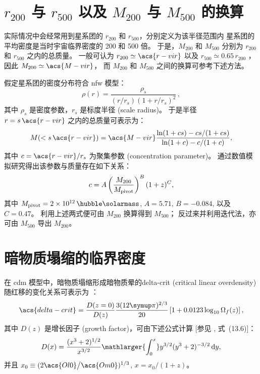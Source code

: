 \section{%
  \texorpdfstring{$r_{200}$}{r200} 与 \texorpdfstring{$r_{500}$}{r500} 以及
  \texorpdfstring{$M_{200}$}{M200} 与 \texorpdfstring{$M_{500}$}{M500} 的换算}
\label{sec:r-m-conv}

实际情况中会经常用到星系团的 $r_{200}$ 和 $r_{500}$，分别定义为该半径范围内
星系团的平均密度是当时宇宙临界密度的 200 和 500 倍。
于是，$M_{200}$ 和 $M_{500}$ 分别为 $r_{200}$ 和 $r_{500}$ 之内的总质量。
一般可认为 $r_{200} \simeq \acs{r-vir}$
以及 $r_{500} \simeq 0.65 \, r_{200}$ \cite{ettori2009}，
因此 $M_{200} \simeq \acs{M-vir}$，
而 $M_{200}$ 和 $M_{500}$ 之间的换算可参考下述方法。

假定星系团的密度分布符合 \ac{nfw} 模型\cite{navarro1997}：
\begin{equation}
  \label{eq:nfw}
  \rho(r) = \frac{\rho_s}{
    (r / r_s) (1 + r / r_s)^2} \,,
\end{equation}
其中 $\rho_s$ 是密度参数，$r_s$ 是标度半径 (scale radius)。
于是半径 $r = s \,\acs{r-vir}$ 之内的总质量可表示为\cite{lokas2001}：
\begin{equation}
  \label{eq:mass-r}
  M(< s \,\acs{r-vir}) = \acs{M-vir}
    \frac{\ln(1 + c s) - c s / (1 + c s)}{\ln(1 + c) - c / (1 + c)} ,
\end{equation}
其中 $c = \acs{r-vir} / r_s$ 为聚集参数 (concentration parameter)。
 通过数值模拟研究得出该参数与质量存在如下关系：
\begin{equation}
  \label{eq:mass-c}
  c = A \left( \frac{M_{200}}{M_{\mathrm{pivot}}} \right)^B (1+z)^C ,
\end{equation}
其中 $M_{\R{pivot}} = \SI{2e12}{\per\hubble\solarmass}$,
$A = 5.71$, $B = -0.084$, 以及 $C = 0.47$。
利用上述两式便可由 $M_{200}$ 换算得到 $M_{500}$；
反过来并利用迭代法，亦可由 $M_{500}$ 导出 $M_{200}$。


\section{暗物质塌缩的临界密度}

在 \ac{cdm} 模型中，暗物质塌缩形成暗物质晕的\acl{delta-crit}
(critical linear overdensity)
随红移的变化关系可表示为 \cite{kitayama1996,randall2002}：
\begin{equation}
  \label{eq:delta-crit}
  \acs{delta-crit} = \frac{D(z=0)}{D(z)}
    \frac{3 (12\Cpi)^{2/3}}{20}
    \left[1 + 0.0123 \log_{10} \Omega_f(z) \right] ,
\end{equation}
其中 $D(z)$ 是增长因子 (growth factor)，可由下述公式计算
[参见 , 式~(13.6)]：
\begin{equation}
  \label{eq:growth-factor}
  D(x) = \frac{(x^3 + 2)^{1/2}}{x^{3/2}}
    \mathlarger{\int_0^x} y^{3/2} (y^3 + 2)^{-3/2} \,\D{y} ,
\end{equation}
并且 $x_0 \equiv (2 \acs{Ol0} \big/ \acs{Om0})^{1/3}$,
$x = x_0 \big/ (1+z)$。


